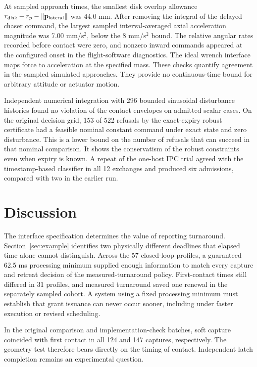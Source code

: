 \documentclass{IEEEtaes}
\begin{document}
At sampled approach times, the smallest disk overlap allowance $r_{\rm disk}-r_p-\lVert \mathbf{p}_{\rm lateral}\rVert$ was 44.0 mm. After removing the integral of the delayed chaser command, the largest sampled interval-averaged axial acceleration magnitude was 7.00 mm/s$^2$, below the 8 mm/s$^2$ bound. The relative angular rates recorded before contact were zero, and nonzero inward commands appeared at the configured onset in the flight-software diagnostics. The ideal wrench interface maps force to acceleration at the specified mass. These checks quantify agreement in the sampled simulated approaches. They provide no continuous-time bound for arbitrary attitude or actuator motion.

Independent numerical integration with 296 bounded sinusoidal disturbance histories found no violation of the contact envelopes on admitted scalar cases. On the original decision grid, 153 of 522 refusals by the exact-expiry robust certificate had a feasible nominal constant command under exact state and zero disturbance. This is a lower bound on the number of refusals that can succeed in that nominal comparison. It shows the conservatism of the robust constraints even when expiry is known. A repeat of the one-host IPC trial agreed with the timestamp-based classifier in all 12 exchanges and produced six admissions, compared with two in the earlier run.

\section{Discussion}

The interface specification determines the value of reporting turnaround. Section~\ref{sec:example} identifies two physically different deadlines that elapsed time alone cannot distinguish. Across the 57 closed-loop profiles, a guaranteed 62.5 ms processing minimum supplied enough information to match every capture and retreat decision of the measured-turnaround policy. First-contact times still differed in 31 profiles, and measured turnaround saved one renewal in the separately sampled cohort. A system using a fixed processing minimum must establish that grant issuance can never occur sooner, including under faster execution or revised scheduling.

In the original comparison and implementation-check batches, soft capture coincided with first contact in all 124 and 147 captures, respectively. The geometry test therefore bears directly on the timing of contact. Independent latch completion remains an experimental question.
\end{document}

